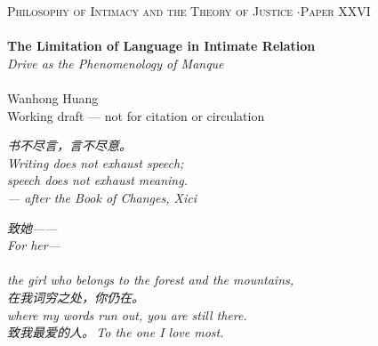 \documentclass[11pt,a4paper]{article}
\begin{document}
\thispagestyle{empty}
\begin{center}
\vspace*{2cm}
{\footnotesize\color{rosedeep}\scshape Philosophy of Intimacy and the Theory of Justice \quad$\cdot$\quad Paper XXVI}\\[0.3cm]
\coverrule\\[1.2cm]
{\LARGE\bfseries\color{warnred} The Limitation of Language in Intimate Relation}\\[0.7cm]
{\large\itshape\color{warnred} Drive as the Phenomenology of Manque}\\[1.6cm]
\coverrule[0.25]\\[0.6cm]
{\normalsize\color{inksoft} Wanhong Huang}\\
\vfill
{\footnotesize\color{gold} Working draft --- not for citation or circulation}
\coverfootnote
\end{center}
\newpage

\thispagestyle{empty}
\vspace*{2.4cm}
\begin{center}
\begin{minipage}{0.76\linewidth}
\centering\itshape\color{rose}
{\cjk 书不尽言，言不尽意。}\\[0.35em]
Writing does not exhaust speech;\\[0.1em]
speech does not exhaust meaning.\\[1.2em]
{\upshape\footnotesize\color{gold} --- after the \emph{Book of Changes}, \emph{Xici}}
\end{minipage}
\end{center}
\newpage

\thispagestyle{empty}
\vspace*{4.5cm}
\begin{center}
\begin{minipage}{0.74\linewidth}
\centering\itshape\color{rose}
{\cjk 致她——}\\[0.3em]
For her---\\[0.7em]
\\[0.2em]
the girl who belongs to the forest and the mountains,\\[0.5em]
{\cjk 在我词穷之处，你仍在。}\\[0.2em]
where my words run out, you are still there.\\[1.0em]
{\upshape\footnotesize\color{gold} {\cjk 致我最爱的人。}\,\;To the one I love most.}
\end{minipage}
\end{center}
\newpage
\end{document}
